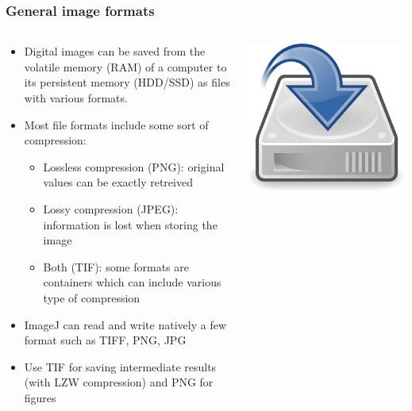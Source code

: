 \documentclass[ignorenonframetext,aspectratio=169,10pt,xcolor=table]{beamer}
\begin{document}
\begin{frame} \frametitle{General image formats}
  \begin{columns}
    \begin{column}{0.75\textwidth}
      \begin{itemize}
      \item Digital images can be saved from the volatile memory (RAM)
        of a computer to its persistent memory (HDD/SSD) as files with various
        formats.
      \item Most file formats include some sort of compression:
        \begin{itemize}
        \item Lossless compression (PNG): original values can be
          exactly retreived
        \item Lossy compression (JPEG): information is lost when
          storing the image
        \item Both (TIF): some formats are containers which can
          include various type of compression
        \end{itemize}
      \item ImageJ can read and write natively a few format such as
        TIFF, PNG, JPG
      \item Use TIF for saving intermediate results (with LZW
        compression) and PNG for figures
      \end{itemize}
    \end{column}
    \begin{column}{0.25\textwidth}
      \includegraphics[width=\textwidth]{drive}
    \end{column}
  \end{columns}
\end{frame}
\end{document}
